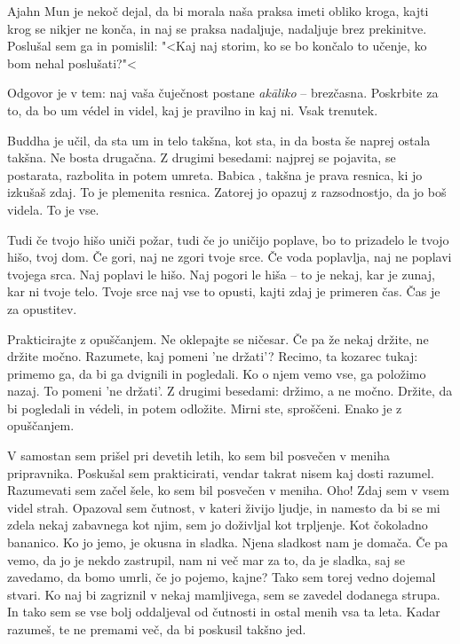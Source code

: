 Ajahn Mun je nekoč dejal, da bi morala naša praksa imeti obliko kroga, kajti krog se nikjer ne konča, in naj se praksa nadaljuje, nadaljuje brez prekinitve. Poslušal sem ga in pomislil: "<Kaj naj storim, ko se bo končalo to učenje, ko bom nehal poslušati?"<

Odgovor je v tem: naj vaša čuječnost postane \emph{akāliko} – brezčasna. Poskrbite za to, da bo um védel in videl, kaj je pravilno in kaj ni. Vsak trenutek.

\clearpage


Buddha je učil, da sta um in telo takšna, kot sta, in da bosta še naprej ostala takšna. Ne bosta drugačna. Z drugimi besedami: najprej se pojavita, se postarata, razbolita in potem umreta. Babica, takšna je prava resnica, ki jo izkušaš zdaj. To je plemenita resnica. Zatorej jo opazuj z razsodnostjo, da jo boš videla. To je vse.

Tudi če tvojo hišo uniči požar, tudi če jo uničijo poplave, bo to prizadelo le tvojo hišo, tvoj dom. Če gori, naj ne zgori tvoje srce. Če voda poplavlja, naj ne poplavi tvojega srca. Naj poplavi le hišo. Naj pogori le hiša – to je nekaj, kar je zunaj, kar ni tvoje telo. Tvoje srce naj vse to opusti, kajti zdaj je primeren čas. Čas je za opustitev.


Prakticirajte z opuščanjem. Ne oklepajte se ničesar. Če pa že nekaj držite, ne držite močno. Razumete, kaj pomeni 'ne držati'? Recimo, ta kozarec tukaj: primemo ga, da bi ga dvignili in pogledali. Ko o njem vemo vse, ga položimo nazaj. To pomeni 'ne držati'. Z drugimi besedami: držimo, a ne močno. Držite, da bi pogledali in védeli, in potem odložite. Mirni ste, sproščeni. Enako je z opuščanjem.

\clearpage


V samostan sem prišel pri devetih letih, ko sem bil posvečen v meniha pripravnika. Poskušal sem prakticirati, vendar takrat nisem kaj dosti razumel. Razumevati sem začel šele, ko sem bil posvečen v meniha. Oho! Zdaj sem v vsem videl strah. Opazoval sem čutnost, v kateri živijo ljudje, in namesto da bi se mi zdela nekaj zabavnega kot njim, sem jo doživljal kot trpljenje. Kot čokoladno bananico. Ko jo jemo, je okusna in sladka. Njena sladkost nam je domača. Če pa vemo, da jo je nekdo zastrupil, nam ni več mar za to, da je sladka, saj se zavedamo, da bomo umrli, če jo pojemo, kajne? Tako sem torej vedno dojemal stvari. Ko naj bi zagriznil v nekaj mamljivega, sem se zavedel dodanega strupa. In tako sem se vse bolj oddaljeval od čutnosti in ostal menih vsa ta leta. Kadar razumeš, te ne premami več, da bi poskusil takšno jed.

